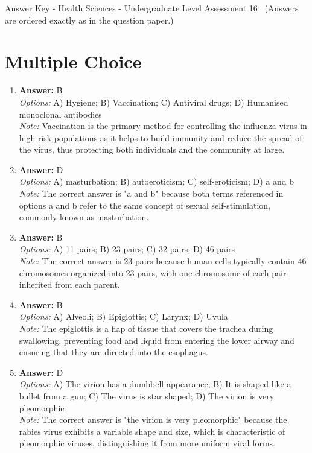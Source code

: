 \documentclass[12pt]{article}
\begin{document}
\begin{center}
Answer Key - Health Sciences - Undergraduate Level Assessment 16 \
\small (Answers are ordered exactly as in the question paper.)
\end{center}

\section*{Multiple Choice}
\begin{enumerate}[label=\arabic*.]
\item \textbf{Answer:} B
\\ \textit{Options:} A) Hygiene; B) Vaccination; C) Antiviral drugs; D) Humanised monoclonal antibodies
\\ \textit{Note:} Vaccination is the primary method for controlling the influenza virus in high-risk populations as it helps to build immunity and reduce the spread of the virus, thus protecting both individuals and the community at large.
\item \textbf{Answer:} D
\\ \textit{Options:} A) masturbation; B) autoeroticism; C) self-eroticism; D) a and b
\\ \textit{Note:} The correct answer is "a and b" because both terms referenced in options a and b refer to the same concept of sexual self-stimulation, commonly known as masturbation.
\item \textbf{Answer:} B
\\ \textit{Options:} A) 11 pairs; B) 23 pairs; C) 32 pairs; D) 46 pairs
\\ \textit{Note:} The correct answer is 23 pairs because human cells typically contain 46 chromosomes organized into 23 pairs, with one chromosome of each pair inherited from each parent.
\item \textbf{Answer:} B
\\ \textit{Options:} A) Alveoli; B) Epiglottis; C) Larynx; D) Uvula
\\ \textit{Note:} The epiglottis is a flap of tissue that covers the trachea during swallowing, preventing food and liquid from entering the lower airway and ensuring that they are directed into the esophagus.
\item \textbf{Answer:} D
\\ \textit{Options:} A) The virion has a dumbbell appearance; B) It is shaped like a bullet from a gun; C) The virus is star shaped; D) The virion is very pleomorphic
\\ \textit{Note:} The correct answer is "the virion is very pleomorphic" because the rabies virus exhibits a variable shape and size, which is characteristic of pleomorphic viruses, distinguishing it from more uniform viral forms.
\end{enumerate}
\end{document}
